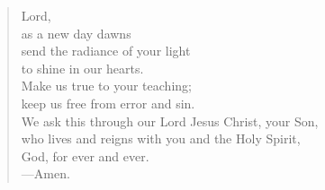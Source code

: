 \prayer

\setlength{\leftmargini}{\prayerleftmargini}

\begin{verse}
Lord,\\
as a new day dawns\\
send the radiance of your light\\
to shine in our hearts.\\
Make us true to your teaching;\\
keep us free from error and sin.\\
We ask this through our Lord Jesus Christ, your Son,\\
who lives and reigns with you and the Holy Spirit,\\
God, for ever and ever.\\
{\color{red}---\thinspace}Amen.
\end{verse}

\setlength{\leftmargini}{\defleftmargini}